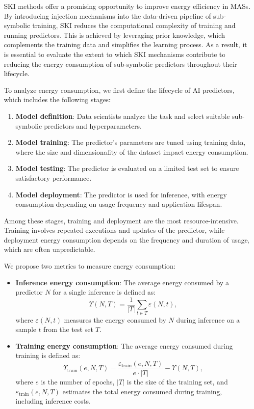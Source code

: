 %
\gls{SKI} methods offer a promising opportunity to improve energy efficiency in \glspl{MAS}.
%
By introducing injection mechanisms into the data-driven pipeline of sub-symbolic training, \gls{SKI} reduces the computational complexity of training and running predictors.
%
This is achieved by leveraging prior knowledge, which complements the training data and simplifies the learning process.
%
As a result, it is essential to evaluate the extent to which \gls{SKI} mechanisms contribute to reducing the energy consumption of sub-symbolic predictors throughout their lifecycle.

%
To analyze energy consumption, we first define the lifecycle of \gls{AI} predictors, which includes the following stages:
%
\begin{enumerate}
    \item \textbf{Model definition}: Data scientists analyze the task and select suitable sub-symbolic predictors and hyperparameters.
    \item \textbf{Model training}: The predictor's parameters are tuned using training data, where the size and dimensionality of the dataset impact energy consumption.
    \item \textbf{Model testing}: The predictor is evaluated on a limited test set to ensure satisfactory performance.
    \item \textbf{Model deployment}: The predictor is used for inference, with energy consumption depending on usage frequency and application lifespan.
\end{enumerate}

%
Among these stages, training and deployment are the most resource-intensive.
%
Training involves repeated executions and updates of the predictor, while deployment energy consumption depends on the frequency and duration of usage, which are often unpredictable.

%
We propose two metrics to measure energy consumption:
%
\begin{itemize}
    \item \textbf{Inference energy consumption}:
    The average energy consumed by a predictor \(N\) for a single inference is defined as:
    \begin{equation}
        \label{eq:inference-energy}
        \Upsilon(N, T) = \frac{1}{|T|} \sum_{t \in T} \varepsilon(N, t),
    \end{equation}
    where \(\varepsilon(N, t)\) measures the energy consumed by \(N\) during inference on a sample \(t\) from the test set \(T\).
    \item \textbf{Training energy consumption}:
    The average energy consumed during training is defined as:
    \begin{equation}
        \label{eq:training-energy}
        \Upsilon_{\text{train}}(e, N, T) = \frac{\varepsilon_{\text{train}}(e, N, T)}{e \cdot |T|} - \Upsilon(N, T),
    \end{equation}
    where \(e\) is the number of epochs, \(|T|\) is the size of the training set, and \(\varepsilon_{\text{train}}(e, N, T)\) estimates the total energy consumed during training, including inference costs.
\end{itemize}

